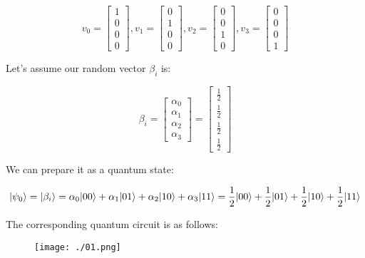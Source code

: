 \documentclass[12pt]{article}
\begin{document}
$$
v_0 = \begin{bmatrix}
1 \\
0 \\
0 \\
0
\end{bmatrix},
v_1 = \begin{bmatrix}
0 \\
1 \\
0 \\
0
\end{bmatrix},
v_2 = \begin{bmatrix}
0 \\
0 \\
1 \\
0
\end{bmatrix},
v_3 = \begin{bmatrix}
0 \\
0 \\
0 \\
1
\end{bmatrix}
$$

Let's assume our random vector $\beta_i$ is:

$$
\beta_{i} =
\begin{bmatrix}
\alpha_0 \\
\alpha_1 \\
\alpha_2 \\
\alpha_3
\end{bmatrix}
=
\begin{bmatrix}
\frac{1}{2} \\
\frac{1}{2} \\
\frac{1}{2} \\
\frac{1}{2}
\end{bmatrix}
$$

We can prepare it as a quantum state:

$$
|\psi_0\rangle=|\beta_{i}\rangle=\alpha_0 |00\rangle +\alpha_1 |01\rangle +\alpha_2 |10\rangle +\alpha_3 |11\rangle\\
=\frac{1}{2} |00\rangle +\frac{1}{2} |01\rangle +\frac{1}{2}  |10\rangle +\frac{1}{2}  |11\rangle
$$

The corresponding quantum circuit is as follows:

\begin{figure}[ht]
\begin{center}
\texttt{[image: ./01.png]} 
\end{center}
\end{figure}
\end{document}
